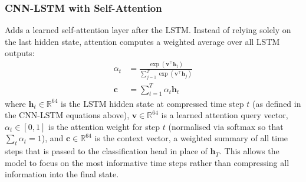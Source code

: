 \documentclass[11pt]{article}
\begin{document}
\subsubsection{CNN-LSTM with Self-Attention}
Adds a learned self-attention layer after the LSTM.
Instead of relying solely on the last hidden state, attention computes a weighted average over all LSTM outputs:
\begin{align}
\alpha_t &= \frac{\exp(\mathbf{v}^\top \mathbf{h}_t)}{\sum_{j=1}^{T} \exp(\mathbf{v}^\top \mathbf{h}_j)} \\
\mathbf{c} &= \sum_{t=1}^{T} \alpha_t \mathbf{h}_t
\end{align}
where $\mathbf{h}_t \in \mathbb{R}^{64}$ is the LSTM hidden state at compressed time step $t$ (as defined in the CNN-LSTM equations above), $\mathbf{v} \in \mathbb{R}^{64}$ is a learned attention query vector, $\alpha_t \in [0, 1]$ is the attention weight for step $t$ (normalised via softmax so that $\sum_t \alpha_t = 1$), and $\mathbf{c} \in \mathbb{R}^{64}$ is the context vector, a weighted summary of all time steps that is passed to the classification head in place of $\mathbf{h}_T$.
This allows the model to focus on the most informative time steps rather than compressing all information into the final state.
\end{document}

